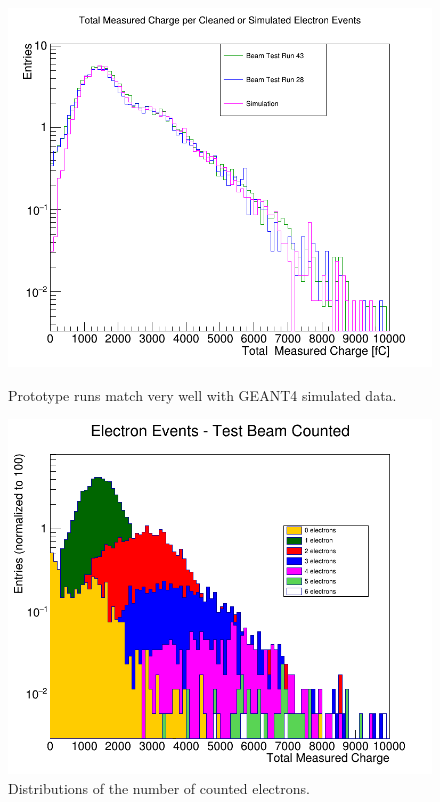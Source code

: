 \begin{figure}
	\centering
	\begin{minipage}[b]{.49\textwidth}
		\includegraphics[width=\linewidth,valign=t]{Calorimeter/SiliconTungstenSiD/combo.png}
		\caption{Prototype runs match very well with GEANT4 simulated data.}
		\label{fig:Calorimeter:SiDECAL:combo}
	\end{minipage}\hfill
	\begin{minipage}[b]{.49\textwidth}
		\includegraphics[width=\linewidth,valign=t]{Calorimeter/SiliconTungstenSiD/tbTagged.png}
		\caption{Distributions of the number of counted electrons.}
		\label{fig:Calorimeter:SiDECAL:tbTagged}
	\end{minipage}
\end{figure}

